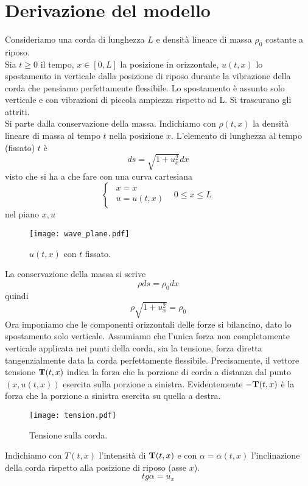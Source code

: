 \section{Derivazione del modello}
Consideriamo una corda di lunghezza $L$ e densit\`a lineare di massa $\rho_0$
costante a riposo.\\
Sia $t≥ 0$ il tempo, $x \in [0,L]$ la posizione in orizzontale,
$u(t,x)$ lo spostamento in verticale dalla posizione di riposo durante la
vibrazione della corda che pensiamo perfettamente flessibile.
Lo spostamento \`e assunto solo verticale e con vibrazioni di piccola ampiezza
rispetto ad L. Si trascurano gli attriti.\\
Si parte dalla conservazione della massa. Indichiamo con $\rho (t,x)$ la
densit\`a
lineare di massa al tempo $t$ nella posizione $x$. L'elemento di lunghezza al
tempo (fissato) $t$ \`e
\[
	ds=\sqrt{1+u_x^2} dx
\]
visto che si ha a che fare con una curva cartesiana
\[
	\left\{
	\begin{array}{ll}
		\begin{array}{l}
			x=x \\
			u=u(t,x)
		\end{array}
	& 0 ≤ x ≤ L
	\end{array}
	\right.
\]
nel piano $x,u$
\begin{figure}[H]
	\centering
	\texttt{[image: wave\_plane.pdf]}
	\caption{$u(t,x)$ con $t$ fissato.}
	\label{wave_plane}
\end{figure}
\noindent
La conservazione della massa si scrive
\[
	\rho ds= \rho_0 dx
\]
quindi
\[
	\rho \sqrt{1 + u_x^2}= \rho_0
\]
Ora imponiamo che le componenti orizzontali delle forze si bilancino, dato lo
spostamento solo verticale.
Assumiamo che l'unica forza non completamente verticale  applicata nei punti
della corda, sia la tensione, forza diretta tangenzialmente data la corda
perfettamente
flessibile.
Precisamente, il vettore tensione ${\bf T}(t,x)$ indica la forza che la porzione
di corda a distanza dal punto $(x, u(t,x))$ esercita sulla porzione a sinistra.
Evidentemente ${\bf -T}(t,x)$ \`e la forza che la porzione a sinistra esercita
su
quella a destra.
\begin{figure}[H]
	\centering
	\texttt{[image: tension.pdf]}
	\caption{Tensione sulla corda.}
	\label{tension}
\end{figure}
\noindent
Indichiamo con $T(t,x)$ l'intensit\`a di ${\bf T}(t,x)$ e con $\alpha= \alpha
(t,x)$
l'inclinazione della corda rispetto alla posizione di riposo (asse $x$).
\[
	tg \alpha = u_x
\]
